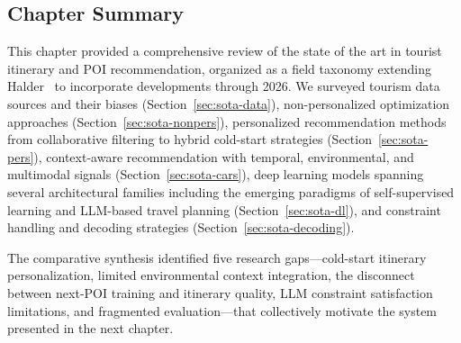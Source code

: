 \subsection{Chapter Summary}
\label{sec:sota-summary}

This chapter provided a comprehensive review of the state of the art in tourist itinerary and POI recommendation, organized as a field taxonomy extending Halder~\cite{halder2022thesis} to incorporate developments through 2026. We surveyed tourism data sources and their biases (Section~\ref{sec:sota-data}), non-personalized optimization approaches (Section~\ref{sec:sota-nonpers}), personalized recommendation methods from collaborative filtering to hybrid cold-start strategies (Section~\ref{sec:sota-pers}), context-aware recommendation with temporal, environmental, and multimodal signals (Section~\ref{sec:sota-cars}), deep learning models spanning several architectural families including the emerging paradigms of self-supervised learning and LLM-based travel planning (Section~\ref{sec:sota-dl}), and constraint handling and decoding strategies (Section~\ref{sec:sota-decoding}).

The comparative synthesis identified five research gaps---cold-start itinerary personalization, limited environmental context integration, the disconnect between next-POI training and itinerary quality, LLM constraint satisfaction limitations, and fragmented evaluation---that collectively motivate the system presented in the next chapter.